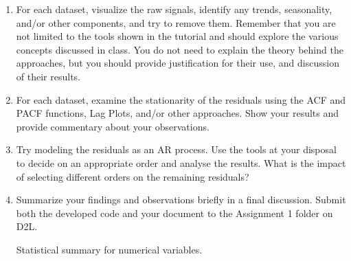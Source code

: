\documentclass[12pt]{article}
\begin{document}

\pagebreak

\begin{enumerate}



\item For each dataset, visualize the raw signals, identify any trends, seasonality, and/or other components, and try to remove them. Remember that you are not limited to the tools shown in the tutorial and should explore the various concepts discussed in class. You do not need to explain the theory behind the approaches, but you should provide justification for their use, and discussion of their results.
\item For each dataset, examine the stationarity of the residuals using the ACF and PACF functions, Lag Plots, and/or other approaches. Show your results and provide commentary about your observations.
\item Try modeling the residuals as an AR process. Use the tools at your disposal to decide on an appropriate order and analyse the results. What is the impact of selecting different orders on the remaining residuals?
\item Summarize your findings and observations briefly in a final discussion. Submit both the developed code and your document to the Assignment 1 folder on D2L.

	\begin{table}[]
	 \centering
	\caption{Statistical summary for numerical variables.
	{\label{tab:stats_num_data}}}
	
	\end{table}



\end{enumerate}
\end{document}
